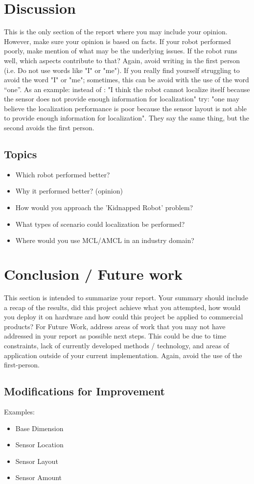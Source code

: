\documentclass[10pt,journal,compsoc]{IEEEtran}
\begin{document}
\section{Discussion}
This is the only section of the report where you may include your opinion. However, make sure your opinion is based on facts. If your robot performed poorly, make mention of what may be the underlying issues. If the robot runs well, which aspects contribute to that? Again, avoid writing in the first person (i.e. Do not use words like "I" or "me"). If you really find yourself struggling to avoid the word "I" or "me"; sometimes, this can be avoid with the use of the word “one”. As an example: instead of : "I think the robot cannot localize itself because the sensor does not provide enough information for localization" try: "one may believe the localization performance is poor because the sensor layout is not able to provide enough information for localization". They say the same thing, but the second avoids the first person. 

\subsection{Topics}
\begin{itemize}
\item Which robot performed better?
\item Why it performed better? (opinion)
\item How would you approach the 'Kidnapped Robot' problem?
\item What types of scenario could localization be performed?
\item Where would you use MCL/AMCL in an industry domain?
\end {itemize}

\section{Conclusion / Future work}
This section is intended to summarize your report. Your summary should include a recap of the results, did this project achieve what you attempted, how would you deploy it on hardware and how could this project be applied to commercial products? 
For Future Work, address areas of work that you may not have addressed in your report as possible next steps. This could be due to time constraints, lack of currently developed methods / technology, and areas of application outside of your current implementation. Again, avoid the use of the first-person.

\subsection{Modifications for Improvement}
Examples:
\begin{itemize}
\item Base Dimension
\item Sensor Location
\item Sensor Layout
\item Sensor Amount
\end{itemize}




\end{document}
